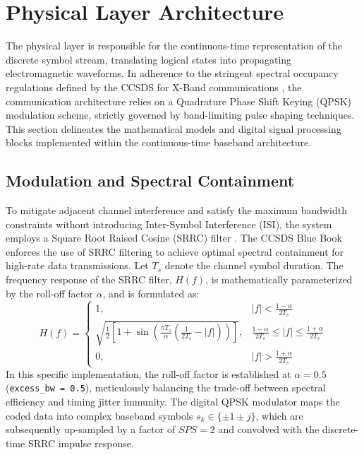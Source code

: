 \section{Physical Layer Architecture} \label{sec:physical_layer}


The physical layer is responsible for the continuous-time representation of the discrete symbol stream, translating logical states into propagating electromagnetic waveforms. In adherence to the stringent spectral occupancy regulations defined by the \textsf{CCSDS} for X-Band communications \autocite{CCSDS_401_0_B_32}, the communication architecture relies on a Quadrature Phase Shift Keying (QPSK) modulation scheme, strictly governed by band-limiting pulse shaping techniques. This section delineates the mathematical models and digital signal processing blocks implemented within the continuous-time baseband architecture.

\subsection{Modulation and Spectral Containment}

To mitigate adjacent channel interference and satisfy the maximum bandwidth constraints without introducing Inter-Symbol Interference (ISI), the system employs a Square Root Raised Cosine (SRRC) filter \autocite{Artes2007}. The CCSDS Blue Book \autocite[Section 2.4.18]{CCSDS_401_0_B_32} enforces the use of SRRC filtering to achieve optimal spectral containment for high-rate data transmissions. Let $T_s$ denote the channel symbol duration. The frequency response of the SRRC filter, $H(f)$, is mathematically parameterized by the roll-off factor $\alpha$, and is formulated as:
\begin{equation}
H(f) = \begin{cases}
1, & |f| < \frac{1-\alpha}{2T_s} \\
\sqrt{\frac{1}{2} \left[ 1 + \sin\left(\frac{\pi T_s}{\alpha} \left( \frac{1}{2T_s} - |f| \right) \right) \right]}, & \frac{1-\alpha}{2T_s} \le |f| \le \frac{1+\alpha}{2T_s} \\
0, & |f| > \frac{1+\alpha}{2T_s}
\end{cases}
\end{equation}
In this specific implementation, the roll-off factor is established at $\alpha = 0.5$ (\texttt{excess\_bw = 0.5}), meticulously balancing the trade-off between spectral efficiency and timing jitter immunity. The digital QPSK modulator maps the coded data into complex baseband symbols $s_k \in \{\pm 1 \pm j\}$, which are subsequently up-sampled by a factor of $SPS = 2$ and convolved with the discrete-time SRRC impulse response. 

